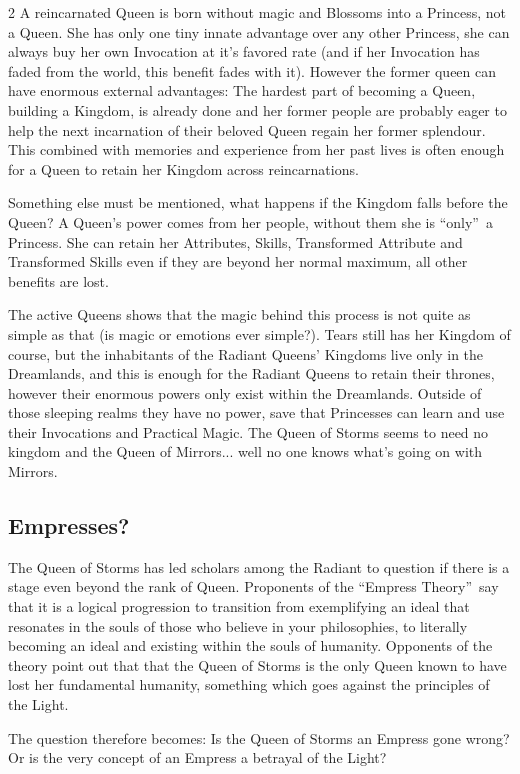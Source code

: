\begin{multicols}{2}
A reincarnated Queen is born without magic and Blossoms into a Princess, not a Queen. She has only one tiny innate advantage over any other Princess, she can always buy her own Invocation at it's favored rate (and if her Invocation has faded from the world, this benefit fades with it). However the former queen can have enormous external advantages: The hardest part of becoming a Queen, building a Kingdom, is already done and her former people are probably eager to help the next incarnation of their beloved Queen regain her former splendour. This combined with memories and experience from her past lives is often enough for a Queen to retain her Kingdom across reincarnations. 

Something else must be mentioned, what happens if the Kingdom falls before the Queen? A Queen's power comes from her people, without them she is \textquotedblleft only\textquotedblright\, a Princess. She can retain her Attributes, Skills, Transformed Attribute and Transformed Skills even if they are beyond her normal maximum, all other benefits are lost. 

The active Queens shows that the magic behind this process is not quite as simple as that (is magic or emotions ever simple?). Tears still has her Kingdom of course, but the inhabitants of the Radiant Queens' Kingdoms live only in the Dreamlands, and this is enough for the Radiant Queens to retain their thrones, however their enormous powers only exist within the Dreamlands. Outside of those sleeping realms they have no power, save that Princesses can learn and use their Invocations and Practical Magic. The Queen of Storms seems to need no kingdom and the Queen of Mirrors... well no one knows what's going on with Mirrors. 

\begin{mybox}

\subsection*{Empresses?}

The Queen of Storms has led scholars among the Radiant to question if there is a stage even beyond the rank of Queen. Proponents of the \textquotedblleft Empress Theory\textquotedblright\, say that it is a logical progression to transition from exemplifying an ideal that resonates in the souls of those who believe in your philosophies, to literally becoming an ideal and existing within the souls of humanity. Opponents of the theory point out that that the Queen of Storms is the only Queen known to have lost her fundamental humanity, something which goes against the principles of the Light.

The question therefore becomes: Is the Queen of Storms an Empress gone wrong? Or is the very concept of an Empress a betrayal of the Light?
\end{mybox}

\end{multicols}
